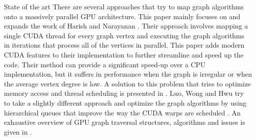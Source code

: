 \documentclass[a4paper,12pt,notitlepage,oneside]{article}
\begin{document}
\begin{section}{State of the art}
There are several approaches that try to map graph algorithms onto a massively parallel GPU architecture. This paper mainly focuses on and expands
the work of Harish and Narayanan \cite{harnar}. Their approach involves mapping a single CUDA thread for every graph vertex and executing the graph algorithms
in iterations that process all of the vertices in parallel.
This paper adds modern CUDA features to their implementation to further streamline and speed up the code. Their method can provide a significant speed-up over
a CPU implementation, but it suffers in performance when the graph is irregular or when the average vertex degree is low.
A solution to this problem that tries to optimize memory access and thread scheduling is presented in \cite{hongKimOguntebiOlukotun}.
Luo, Wong and Hwu try to take a slightly different approach and optimize the graph algorithms by using hierarchical queues that improve the way
the CUDA warps are scheduled \cite{luoWongHwu}.
An exhaustive overview of GPU graph traversal structures, algorithms and issues is given in \cite{wangOwens}.
\end{section}
\end{document}
